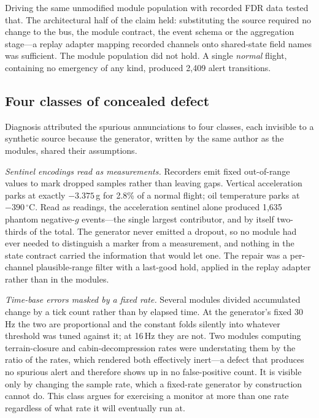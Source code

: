 \documentclass[conference]{IEEEtran}
\begin{document}
Driving the same unmodified module population with recorded FDR data tested
that. The architectural half of the claim held: substituting the source
required no change to the bus, the module contract, the event schema or the
aggregation stage---a replay adapter mapping recorded channels onto
shared-state field names was sufficient. The module population did not hold. A
single \emph{normal} flight, containing no emergency of any kind, produced
2{,}409 alert transitions.

\subsection{Four classes of concealed defect}

Diagnosis attributed the spurious annunciations to four classes, each
invisible to a synthetic source because the generator, written by the same
author as the modules, shared their assumptions.

\textit{Sentinel encodings read as measurements.} Recorders emit fixed
out-of-range values to mark dropped samples rather than leaving gaps. Vertical
acceleration parks at exactly $-3.375$\,g for 2.8\% of a normal flight; oil
temperature parks at $-390$\,$^\circ$C. Read as readings, the acceleration
sentinel alone produced 1{,}635 phantom negative-$g$ events---the single
largest contributor, and by itself two-thirds of the total. The generator
never emitted a dropout, so no module had ever needed to distinguish a marker
from a measurement, and nothing in the state contract carried the information
that would let one. The repair was a per-channel plausible-range filter with a
last-good hold, applied in the replay adapter rather than in the modules.

\textit{Time-base errors masked by a fixed rate.} Several modules divided
accumulated change by a tick count rather than by elapsed time. At the
generator's fixed 30\,Hz the two are proportional and the constant folds
silently into whatever threshold was tuned against it; at 16\,Hz they are not.
Two modules computing terrain-closure and cabin-decompression rates were
understating them by the ratio of the rates, which rendered both effectively
inert---a defect that produces no spurious alert and therefore shows up in no
false-positive count. It is visible only by changing the sample rate, which a
fixed-rate generator by construction cannot do. This class argues for
exercising a monitor at more than one rate regardless of what rate it will
eventually run at.
\end{document}
